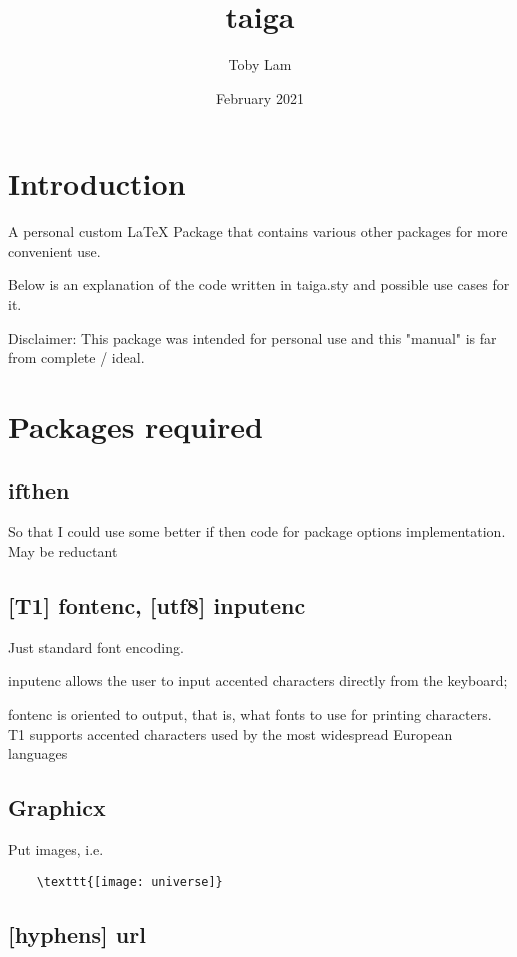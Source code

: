 \documentclass{article}
\title{taiga}
\author{Toby Lam}
\date{February 2021}
\begin{document}
\maketitle

\section{Introduction}

A personal custom LaTeX Package that contains various other packages for more convenient use.

Below is an explanation of the code written in taiga.sty and possible use cases for it.

Disclaimer: This package was intended for personal use and this "manual" is far from complete / ideal.

\section{Packages required}

\subsection{ifthen}

So that I could use some better if then code for package options implementation. May be reductant

\subsection{[T1] fontenc, [utf8] inputenc}

Just standard font encoding.

inputenc allows the user to input accented characters directly from the keyboard; 

fontenc is oriented to output, that is, what fonts to use for printing characters. T1 supports accented characters used by the most widespread European languages

\subsection{Graphicx}

Put images, i.e.

\begin{verbatim}
	\texttt{[image: universe]}
\end{verbatim} 

\subsection{[hyphens] url}
\end{document}
